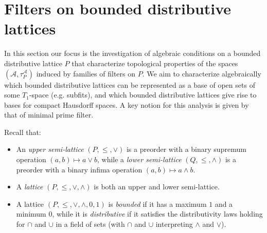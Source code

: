 \documentclass{article}
\newcommand{\aaa}{\mathcal{A} }
\newcommand{\open}[1]{\mathcal{N}^{\mathcal{A}}_{#1}}
\newcommand{\atpa}{(\aaa, \tau^\aaa_P)}
\theoremstyle{plain}
\newtheorem{fact}[theorem]{Fact}
\theoremstyle{definition}
\theoremstyle{remark}
\newcommand{\Reg}[1]{\text{Reg}\left(#1\right)}
\newcommand{\bp}[1]{\left\lbrace #1 \right\rbrace}
\newcommand{\0}{\mathbbm 0}
\newcommand{\1}{\mathbbm 1}
\newcommand{\2}{\mathbbm 2}
\begin{document}
%
%
%





\section{Filters on bounded distributive lattices}
\label{sec:filtersonboundeddistributivelattices}

In this section our focus is the investigation of algebraic conditions on a bounded distributive lattice $P$ that characterize topological properties of the spaces $(\mathcal{A},\tau^{\mathcal{A}}_P)$ induced by families of filters on $P$. We aim to characterize algebraically which bounded distributive lattices can be represented as a base of open sets of some $T_1$-space (e.g. subfits), and which bounded distributive lattices give rise to bases for compact Hausdorff spaces.
A key notion for this analysis is given by that of minimal prime filter.

Recall that:
\begin{itemize}
\item
An \emph{upper semi-lattice} $(P,\leq,\vee)$ is a preorder with a binary supremum operation $(a,b)\mapsto a\vee b$, while a \emph{lower semi-lattice} $(Q,\leq,\wedge)$ is a preorder with a binary infima operation $(a,b)\mapsto a\wedge b$.
\item
A \emph{lattice} $(P,\leq,\vee,\wedge)$ is both an upper and lower semi-lattice. 
\item 
A lattice $(P,\leq,\vee,\wedge,0,1)$ is \emph{bounded} if it has a maximum $1$ and a minimum $0$, while it is \emph{distributive} if it satisfies the distributivity laws holding for $\cap$ and $\cup$ in a field of sets (with $\cap$  and $\cup$ interpreting $\wedge$ and $\vee$).
\end{itemize}
\end{document}
